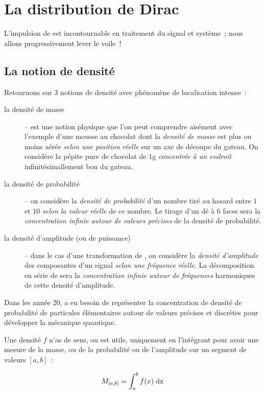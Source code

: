 \chapter{La distribution de Dirac}
\label{sec:dirac}

L'impulsion de \Dirac{} est incontournable en traitement du signal et système~; nous allons progressivement lever le voile~!

\section{La notion de densité}

Retournons sur 3 notions de densité avec phénomène de localisation intense~:
\begin{description}
\item [la densité de masse] -- est une notion physique que l'on peut comprendre aisément avec l'exemple d'une mousse au chocolat dont la \emph{densité de masse} est plus ou moins aérée \emph{selon une position réelle} sur un axe de découpe du gateau. On considère la pépite pure de chocolat de $1$g \emph{concentrée à un endroit} infinitésimallement bon du gateau.
\item[la densité de probabilité] -- on considère la \emph{densité de probabilité} d'un nombre tiré au hasard entre $1$ et $10$\emph{ selon la valeur réelle} de ce nombre. Le tirage d'un dé à 6 faces sera la \emph{concentration infinie autour de valeurs précises} de la densité de probabilité.
\item[la densité d'amplitude (ou de puissance)] -- dans le cas d'une transformation de \Fourier{}, on considère la \emph{densité d'amplitude} des composantes d'un signal \emph{selon une fréquence réelle}. La décomposition en série de \Fourier{} sera la \emph{concentration infinie autour de fréquences} harmoniques de cette densité d'amplitude.    
\end{description}


Dans les année 20, \Dirac{} a eu besoin de représenter la concentration de densité de probabilité de particules élémentaires autour de valeurs précises et discrètes pour développer la mécanique quantique.

Une densité $f$ n'as de sens, ou est utile, uniquement en l'intègrant pour avoir une \og{} mesure\fg{} de la masse, ou de la probabilité ou de l'amplitude sur un segment de valeurs $[a, b]$~:

\begin{equation}
  \label{eq:densite_mesure}
  M_{[a, b]} = \int_a^b f(x)\;\mathrm{d{x}}
\end{equation}

